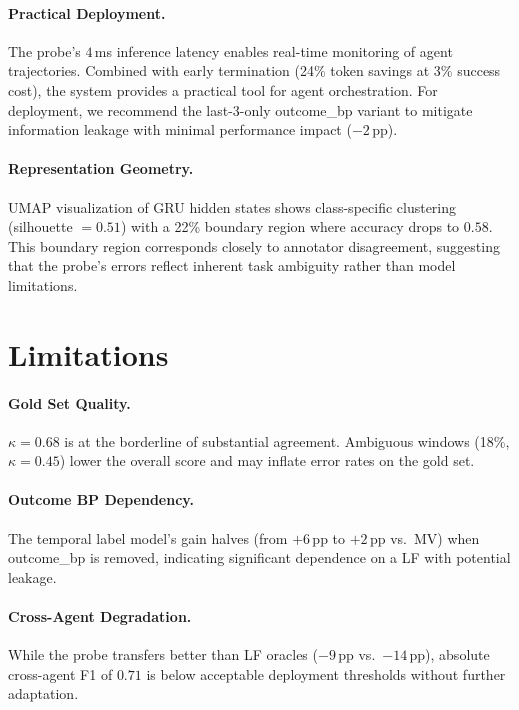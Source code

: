 \documentclass[11pt]{article}
\begin{document}
\paragraph{Practical Deployment.}
The probe's $4$\,ms inference latency enables real-time monitoring of agent trajectories.
Combined with early termination (24\% token savings at 3\% success cost), the system provides a practical tool for agent orchestration.
For deployment, we recommend the last-3-only outcome\_bp variant to mitigate information leakage with minimal performance impact ($-2$\,pp).

\paragraph{Representation Geometry.}
UMAP visualization of GRU hidden states shows class-specific clustering (silhouette $= 0.51$) with a 22\% boundary region where accuracy drops to $0.58$.
This boundary region corresponds closely to annotator disagreement, suggesting that the probe's errors reflect inherent task ambiguity rather than model limitations.

\section{Limitations}
\label{sec:limitations}

\paragraph{Gold Set Quality.}
$\kappa = 0.68$ is at the borderline of substantial agreement.
Ambiguous windows (18\%, $\kappa = 0.45$) lower the overall score and may inflate error rates on the gold set.

\paragraph{Outcome BP Dependency.}
The temporal label model's gain halves (from $+6$\,pp to $+2$\,pp vs.\ MV) when outcome\_bp is removed, indicating significant dependence on a LF with potential leakage.

\paragraph{Cross-Agent Degradation.}
While the probe transfers better than LF oracles ($-9$\,pp vs.\ $-14$\,pp), absolute cross-agent F1 of $0.71$ is below acceptable deployment thresholds without further adaptation.
\end{document}
